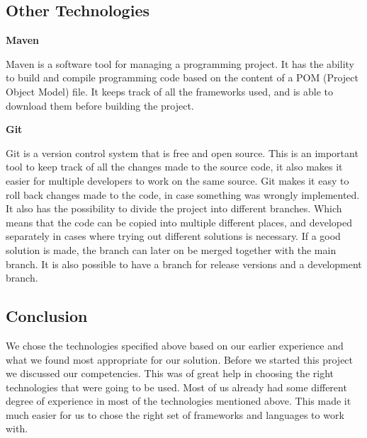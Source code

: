 \subsection{Other Technologies}

\textbf{Maven}

Maven is a software tool for managing a programming project.
It has the ability to build and compile programming code based on the content of a POM (Project Object Model) file.
It keeps track of all the frameworks used, and is able to download them before building the project. \cite{Maven}

\textbf{Git}

Git is a version control system that is free and open source.
This is an important tool to keep track of all the changes made to the source code, it also makes it easier for multiple developers to work on the same source.
Git makes it easy to roll back changes made to the code, in case something was wrongly implemented.
It also has the possibility to divide the project into different branches.
Which means that the code can be copied into multiple different places, and developed separately in cases where trying out different solutions is necessary.
If a good solution is made, the branch can later on be merged together with the main branch.
It is also possible to have a branch for release versions and a development branch. \cite{Git}

\subsection{Conclusion}

We chose the technologies specified above based on our earlier experience and what we found most appropriate for our solution.
Before we started this project we discussed our competencies.
This was of great help in choosing the right technologies that were going to be used.
Most of us already had some different degree of experience in most of the technologies mentioned above.
This made it much easier for us to chose the right set of frameworks and languages to work with.

